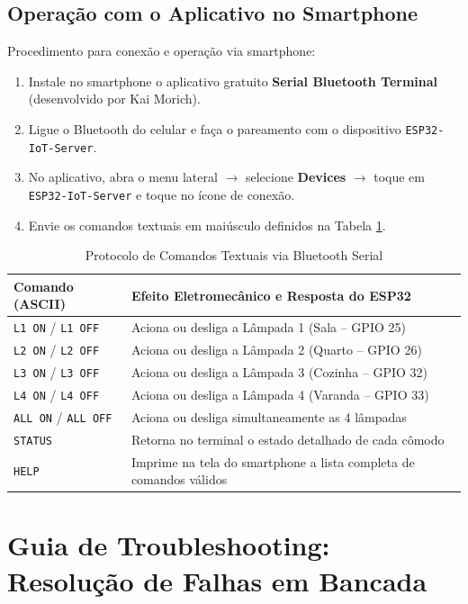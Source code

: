 \documentclass[a4paper,11pt]{article}
\begin{document}
\subsection{Operação com o Aplicativo no Smartphone}
Procedimento para conexão e operação via smartphone:
\begin{enumerate}
    \item Instale no smartphone o aplicativo gratuito \textbf{Serial Bluetooth Terminal} (desenvolvido por Kai Morich).
    \item Ligue o Bluetooth do celular e faça o pareamento com o dispositivo \texttt{ESP32-IoT-Server}.
    \item No aplicativo, abra o menu lateral $\rightarrow$ selecione \textbf{Devices} $\rightarrow$ toque em \texttt{ESP32-IoT-Server} e toque no ícone de conexão.
    \item Envie os comandos textuais em maiúsculo definidos na Tabela \ref{tab:comandos_bt}.
\end{enumerate}

\begin{table}[H]
\centering
\caption{Protocolo de Comandos Textuais via Bluetooth Serial}
\label{tab:comandos_bt}
\begin{tabularx}{\textwidth}{lX}
\toprule
\textbf{Comando (ASCII)} & \textbf{Efeito Eletromecânico e Resposta do ESP32} \\
\midrule
\texttt{L1 ON} / \texttt{L1 OFF} & Aciona ou desliga a Lâmpada 1 (Sala -- GPIO 25) \\
\texttt{L2 ON} / \texttt{L2 OFF} & Aciona ou desliga a Lâmpada 2 (Quarto -- GPIO 26) \\
\texttt{L3 ON} / \texttt{L3 OFF} & Aciona ou desliga a Lâmpada 3 (Cozinha -- GPIO 32) \\
\texttt{L4 ON} / \texttt{L4 OFF} & Aciona ou desliga a Lâmpada 4 (Varanda -- GPIO 33) \\
\texttt{ALL ON} / \texttt{ALL OFF} & Aciona ou desliga simultaneamente as 4 lâmpadas \\
\texttt{STATUS} & Retorna no terminal o estado detalhado de cada cômodo \\
\texttt{HELP} & Imprime na tela do smartphone a lista completa de comandos válidos \\
\bottomrule
\end{tabularx}
\end{table}

\section{Guia de Troubleshooting: Resolução de Falhas em Bancada}
\end{document}
